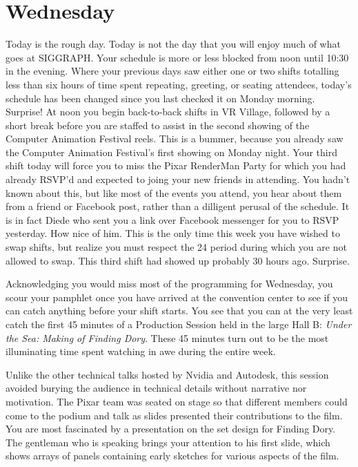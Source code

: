 \documentclass[../main.tex]{subfiles}
\begin{document}
\section{Wednesday}

Today is the rough day. Today is not the day that you will enjoy much of what goes at SIGGRAPH. Your schedule is more or less blocked from noon until 10:30 in the evening. Where your previous days saw either one or two shifts totalling less than six hours of time spent repeating, greeting, or seating attendees, today's schedule has been changed since you last checked it on Monday morning. Surprise! At noon you begin back-to-back shifts in VR Village, followed by a short break before you are staffed to assist in the second showing of the Computer Animation Festival reels. This is a bummer, because you already saw the Computer Animation Festival's first showing on Monday night. Your third shift today will force you to miss the Pixar RenderMan Party for which you had already RSVP'd and expected to joing your new friends in attending. You hadn't known about this, but like most of the events you attend, you hear about them from a friend or Facebook post, rather than a dilligent perusal of the schedule. It is in fact Diede who sent you a link over Facebook messenger for you to RSVP yesterday. How nice of him. This is the only time this week you have wished to swap shifts, but realize you must respect the 24 period during which you are not allowed to swap. This third shift had showed up probably 30 hours ago. Surprise.

Acknowledging you would miss most of the programming for Wednesday, you scour your pamphlet once you have arrived at the convention center to see if you can catch anything before your shift starts.  You see that you can at the very least catch the first 45 minutes of a Production Session held in the large Hall B: \textit{Under the Sea: Making of Finding Dory}. These 45 minutes turn out to be the most illuminating time spent watching in awe during the entire week.

Unlike the other technical talks hosted by Nvidia and Autodesk, this session avoided burying the audience in technical details without narrative nor motivation. The Pixar team was seated on stage so that different members could come to the podium and talk as slides presented their contributions to the film. You are most fascinated by a presentation on the set design for Finding Dory. The gentleman who is speaking brings your attention to his first slide, which shows arrays of panels containing early sketches for various aspects of the film.
\end{document}
